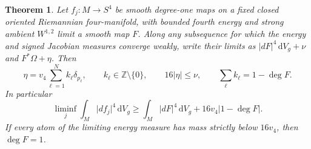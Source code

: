 \documentclass[11pt]{article}
\numberwithin{equation}{section}
\newtheorem{theorem}{Theorem}[section]
\newcommand{\dd}{\mathrm{d}}
\newcommand{\abs}[1]{\lvert #1\rvert}
\newcommand{\dv}{\dd V_g}
\begin{document}
\begin{theorem}\label{thm:degree}
Let \(f_j:M\to S^4\) be smooth degree-one maps on a fixed
closed oriented Riemannian four-manifold, with bounded fourth
energy and strong ambient \(W^{1,2}\) limit a smooth map \(F\).
Along any subsequence for which the energy and signed Jacobian
measures converge weakly, write their limits as
\(\abs{dF}^4\,\dv+\nu\) and \(F^*\Omega+\eta\). Then
\begin{equation}\label{eq:atoms}
 \eta=v_4\sum_{\ell=1}^{N}k_\ell\delta_{p_\ell},\qquad
 k_\ell\in\mathbb Z\setminus\{0\},\qquad
 16\abs{\eta}\le\nu,\qquad
 \sum_\ell k_\ell=1-\deg F .
\end{equation}
In particular
\begin{equation}\label{eq:energy-gap}
 \liminf_j\int_M\abs{df_j}^4\,\dv
 \ge \int_M\abs{dF}^4\,\dv+16v_4\abs{1-\deg F}.
\end{equation}
If every atom of the limiting energy measure has mass strictly
below \(16v_4\), then \(\deg F=1\).
\end{theorem}
\end{document}
